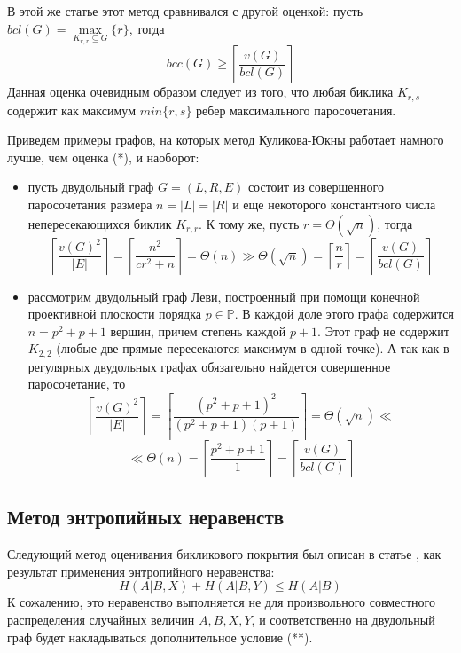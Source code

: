 \documentclass[a4paper]{article}
\begin{document}
В этой же статье \cite{KulikovJukna} этот метод сравнивался с другой оценкой: пусть $bcl(G) = \max\limits_{K_{r,r}\subseteq G}\{r\}$, 
тогда
\[bcc(G) \geq \left\lceil\frac{v(G)}{bcl(G)}\right\rceil \tag{*}\]
Данная оценка очевидным образом следует из того, что любая биклика $K_{r, s}$ содержит как максимум 
$min\{r, s\}$ ребер максимального паросочетания.

Приведем примеры графов, на которых метод Куликова-Юкны работает намного лучше, чем оценка (*), и наоборот:

\begin{itemize}
    \item пусть двудольный граф $G = (L, R, E)$ состоит из совершенного паросочетания размера 
    $n = |L| = |R|$ и еще некоторого константного числа непересекающихся биклик $K_{r,r}$. 
    К тому же, пусть $r = \Theta(\sqrt{n})$, тогда $$\left\lceil\frac{v(G)^2}{|E|}\right\rceil = 
    \left\lceil\frac{n^2}{cr^2 + n}\right\rceil = \Theta(n) \gg \Theta(\sqrt{n}) = \left\lceil\frac{n}{r}\right\rceil = 
    \left\lceil\frac{v(G)}{bcl(G)}\right\rceil$$ 
    \item рассмотрим двудольный граф Леви, построенный при помощи конечной проективной плоскости порядка 
    $p\in \mathbb{P}$. В каждой доле этого графа содержится $n = p^2 + p + 1$ вершин, причем степень 
    каждой $p+1$. Этот граф не содержит $K_{2,2}$ (любые две прямые пересекаются максимум в одной точке). 
    А так как в регулярных двудольных графах обязательно найдется совершенное паросочетание, то 
    $$\left\lceil\frac{v(G)^2}{|E|}\right\rceil = \left\lceil\frac{(p^2 + p + 1)^2}{(p^2+p+1)(p+1)}\right\rceil = 
    \Theta(\sqrt{n}) \ll$$ $$\ll \Theta(n) = \left\lceil\frac{p^2 + p + 1}{1}\right\rceil = \left\lceil\frac{v(G)}{bcl(G)}\right\rceil$$
\end{itemize}




\subsection{Метод энтропийных неравенств}

Следующий метод оценивания бикликового покрытия был описан в статье \cite{EntropyInequality}, как результат 
применения энтропийного неравенства: $$H(A|B,X) + H(A|B,Y) \leq H(A|B)$$ К сожалению, это неравенство 
выполняется не для произвольного совместного распределения случайных величин $A, B, X, Y$, и соответственно 
на двудольный граф будет накладываться дополнительное условие (**).
\end{document}
